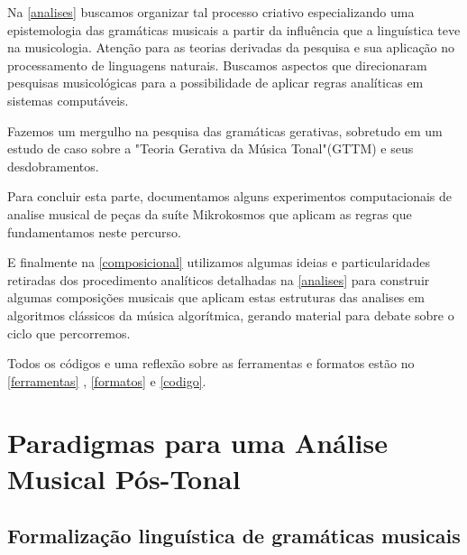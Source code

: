\documentclass[
	12pt,				%
	openright,			%
	twoside,			%
	a4paper,			%
	english,			%
	french,				%
	spanish,			%
	brazil				%
	]{abntex2}
\begin{document}
Na \autoref{analises} buscamos organizar tal processo criativo especializando uma epistemologia das gramáticas musicais a partir da influência que a linguística teve na musicologia. Atenção para as teorias derivadas da pesquisa  e sua aplicação no processamento de linguagens naturais. Buscamos aspectos que direcionaram pesquisas musicológicas para a possibilidade de aplicar regras analíticas em sistemas computáveis.

Fazemos um mergulho na pesquisa das gramáticas gerativas, sobretudo em um estudo de caso sobre a "Teoria Gerativa da Música Tonal"(GTTM) e seus desdobramentos. 

Para concluir esta parte, documentamos alguns experimentos computacionais de analise musical de peças da suíte Mikrokosmos que aplicam as regras que fundamentamos neste percurso.

E finalmente na \autoref{composicional} utilizamos algumas ideias e particularidades retiradas dos procedimento analíticos detalhadas na \autoref{analises} para construir algumas composições musicais que aplicam estas estruturas das analises em algoritmos clássicos da música algorítmica, gerando material para debate sobre o ciclo que percorremos.

Todos os códigos e uma reflexão sobre as ferramentas e formatos estão no \autoref{ferramentas} , \autoref{formatos} e \autoref{codigo}.






















\part{Paradigmas para uma Análise Musical Pós-Tonal}
\label{analises}




\chapter{Formalização linguística de gramáticas musicais }
\end{document}
